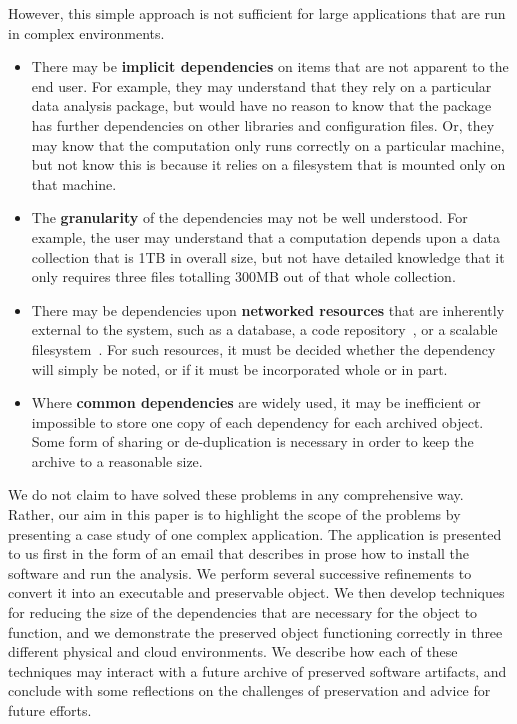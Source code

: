 \documentclass{sig-alternate}
\begin{document}
However, this simple approach is not sufficient for large applications
that are run in complex environments.

\begin{itemize}
\item There may be {\bf implicit dependencies} on items that are
not apparent to the end user.  For example, they may understand that
they rely on a particular data analysis package, but would have
no reason to know that the package has further dependencies on
other libraries and configuration files.  Or, they may know that
the computation only runs correctly on a particular machine, but
not know this is because it relies on a filesystem that
is mounted only on that machine.

\item The {\bf granularity} of the dependencies may not be well understood.
For example, the user may understand that a computation depends upon
a data collection that is 1TB in overall size, but not have detailed
knowledge that it only requires three files totalling 300MB out of that
whole collection.

\item There may be dependencies upon {\bf networked resources} that
are inherently external to the system, such as a database, a code
repository~\cite{cms2006cmssw}, or a scalable filesystem~\cite{blomer2011cernvm}.  For such resources, it
must be decided whether the dependency will simply be noted, or if it
must be incorporated whole or in part.

\item Where {\bf common dependencies} are widely used, it may be inefficient or
impossible to store one copy of each dependency for each archived object.
Some form of sharing or de-duplication is necessary in order to keep
the archive to a reasonable size.
\end{itemize}

We do not claim to have solved these problems in any comprehensive
way.  Rather, our aim in this paper is to highlight the scope
of the problems by presenting a case study of one complex application.
The application is presented to us
first in the form of an email that describes in prose how to install
the software and run the analysis.  We perform several successive
refinements to convert it into an executable and preservable object.
We then develop techniques for reducing the size of the dependencies
that are necessary for the object to function, and we demonstrate
the preserved object functioning correctly in three different
physical and cloud environments.
We describe how each of these techniques may interact with
a future archive of preserved software artifacts, and conclude with
some reflections on the challenges of preservation and advice for future efforts.
\end{document}
